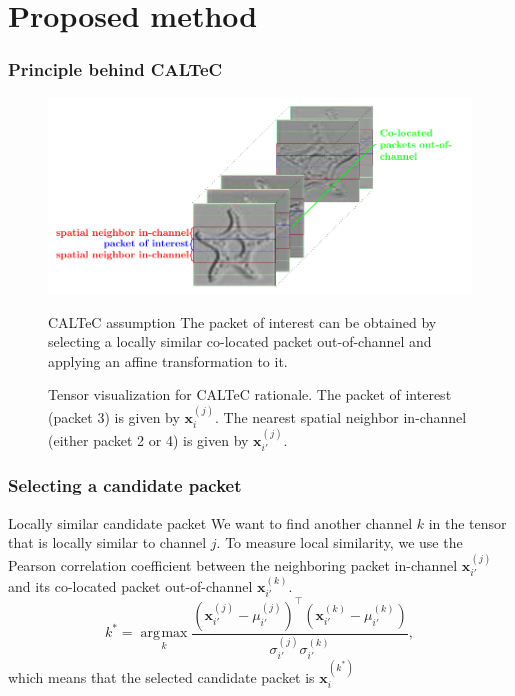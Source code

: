 \documentclass[aspectratio=169]{beamer}
\DeclareMathOperator*{\argmax}{\arg\!\max}
\begin{document}
\section{Proposed method}

\begin{frame}
	\frametitle{Principle behind CALTeC}
	\begin{figure}
		\begin{minipage}{.64\textwidth}
			\includegraphics[width=\linewidth]{tensorvizcaltec.pdf}
			\caption{Tensor visualization for CALTeC rationale. The packet of interest (packet 3) is given by $\mathbf{x}_i^{(j)}$. The nearest spatial neighbor in-channel (either packet 2 or 4) is given by $\mathbf{x}_{i'}^{(j)}$.}
		\end{minipage}\hfill
		\begin{minipage}{.32\textwidth}
				\begin{block}{CALTeC assumption}
		The packet of interest can be obtained by selecting a locally similar co-located packet out-of-channel and applying an affine transformation to it. 
	\end{block}
		\end{minipage}
	\end{figure}
\end{frame}

\begin{frame}
	\frametitle{Selecting a candidate packet}
	\begin{block}{Locally similar candidate packet}
		We want to find another channel $k$ in the tensor that is locally similar to channel $j$. To measure local similarity, we use the Pearson correlation coefficient between the neighboring packet in-channel $\mathbf{x}_{i'}^{(j)}$ and its co-located packet out-of-channel $\mathbf{x}_{i'}^{(k)}$.
		\[
		 k^* = \underset{k}{\argmax} \frac{\left(\mathbf{x}_{i'}^{(j)}-\mu_{i'}^{(j)}\right)^\top \left(\mathbf{x}_{i'}^{(k)}-\mu_{i'}^{(k)}\right)}{\sigma_{i'}^{(j)}\sigma_{i'}^{(k)}},
		\label{eq:Pearson_coefficient}
		\]
		which means that the selected candidate packet is $\mathbf{x}_i^{(k^*)}$
	\end{block}
\end{frame}
\end{document}
